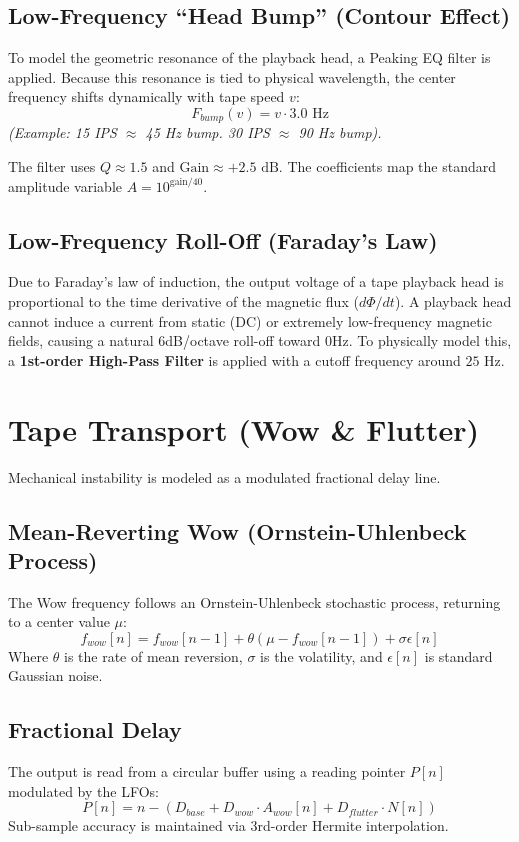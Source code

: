 \documentclass[a4paper, 11pt]{article}
\begin{document}
\subsection{Low-Frequency ``Head Bump'' (Contour Effect)}
To model the geometric resonance of the playback head, a Peaking EQ filter is applied. Because this resonance is tied to physical wavelength, the center frequency shifts dynamically with tape speed $v$:
\begin{equation}
    F_{bump}(v) = v \cdot 3.0 \text{ Hz}
\end{equation}
\textit{(Example: 15 IPS $\approx$ 45 Hz bump. 30 IPS $\approx$ 90 Hz bump).}

The filter uses $Q \approx 1.5$ and $\text{Gain} \approx +2.5 \text{ dB}$. The coefficients map the standard amplitude variable $A = 10^{\text{gain}/40}$.

\subsection{Low-Frequency Roll-Off (Faraday's Law)}
Due to Faraday's law of induction, the output voltage of a tape playback head is proportional to the time derivative of the magnetic flux ($d\Phi/dt$). A playback head cannot induce a current from static (DC) or extremely low-frequency magnetic fields, causing a natural 6dB/octave roll-off toward 0Hz.
To physically model this, a \textbf{1st-order High-Pass Filter} is applied with a cutoff frequency around $25\text{ Hz}$.

\section{Tape Transport (Wow \& Flutter)}
Mechanical instability is modeled as a modulated fractional delay line.

\subsection{Mean-Reverting Wow (Ornstein-Uhlenbeck Process)}
The Wow frequency follows an Ornstein-Uhlenbeck stochastic process, returning to a center value $\mu$:
\begin{equation}
    f_{wow}[n] = f_{wow}[n-1] + \theta (\mu - f_{wow}[n-1]) + \sigma \epsilon[n]
\end{equation}
Where $\theta$ is the rate of mean reversion, $\sigma$ is the volatility, and $\epsilon[n]$ is standard Gaussian noise.

\subsection{Fractional Delay}
The output is read from a circular buffer using a reading pointer $P[n]$ modulated by the LFOs:
\begin{equation}
    P[n] = n - \left(D_{base} + D_{wow} \cdot A_{wow}[n] + D_{flutter} \cdot N[n]\right)
\end{equation}
Sub-sample accuracy is maintained via 3rd-order Hermite interpolation.
\end{document}
